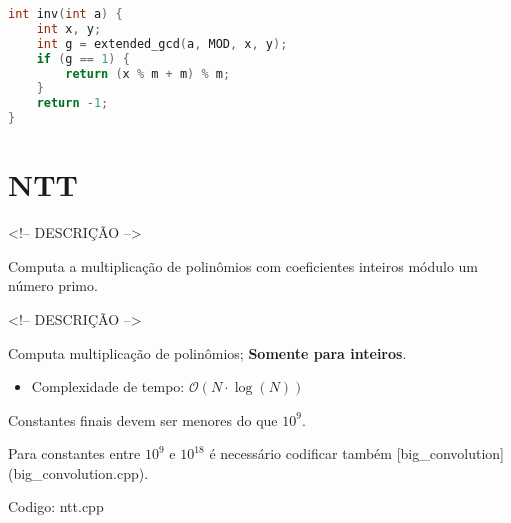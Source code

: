 \documentclass[10pt, a4paper, oneside]{book}
\begin{document}
\begin{lstlisting}[language=C++]
int inv(int a) {
    int x, y;
    int g = extended_gcd(a, MOD, x, y);
    if (g == 1) {
        return (x % m + m) % m;
    }
    return -1;
}
\end{lstlisting}
\hfill

\section{NTT}


<!-- DESCRIÇÃO -->

Computa a multiplicação de polinômios com coeficientes inteiros módulo um número primo.

<!-- DESCRIÇÃO -->



Computa multiplicação de polinômios; \textbf{Somente para inteiros}.



\begin{itemize}
\item Complexidade de tempo: $\mathcal{O}(N \cdot \log(N))$
\end{itemize}



Constantes finais devem ser menores do que $10^9$.  

Para constantes entre $10^9$ e $10^{18}$ é necessário codificar também [big\_convolution](big\_convolution.cpp).

\hfill

Codigo: ntt.cpp
\end{document}

